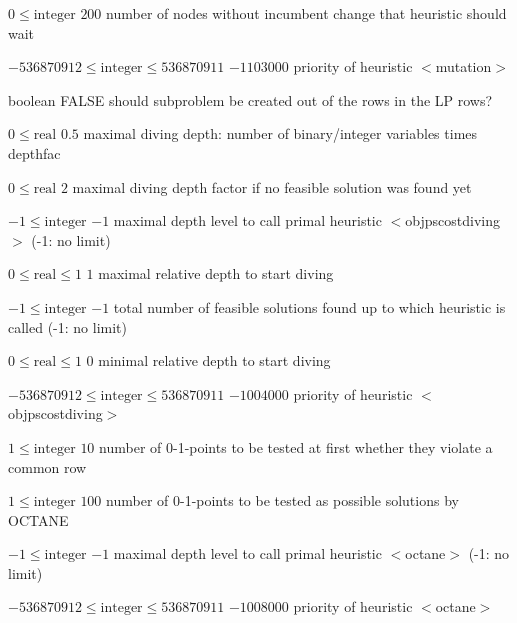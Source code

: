 %
{$0\leq\textrm{integer}$}%
{$200$}%
{number of nodes without incumbent change that heuristic should wait}%
{}

%
{$-536870912\leq\textrm{integer}\leq536870911$}%
{$-1103000$}%
{priority of heuristic $<$mutation$>$}%
{}

%
{boolean}%
{FALSE}%
{should subproblem be created out of the rows in the LP rows?}%
{}

%
{$0\leq\textrm{real}$}%
{$0.5$}%
{maximal diving depth: number of binary/integer variables times depthfac}%
{}

%
{$0\leq\textrm{real}$}%
{$2$}%
{maximal diving depth factor if no feasible solution was found yet}%
{}

%
{$-1\leq\textrm{integer}$}%
{$-1$}%
{maximal depth level to call primal heuristic $<$objpscostdiving$>$ (-1: no limit)}%
{}

%
{$0\leq\textrm{real}\leq1$}%
{$1$}%
{maximal relative depth to start diving}%
{}

%
{$-1\leq\textrm{integer}$}%
{$-1$}%
{total number of feasible solutions found up to which heuristic is called (-1: no limit)}%
{}

%
{$0\leq\textrm{real}\leq1$}%
{$0$}%
{minimal relative depth to start diving}%
{}

%
{$-536870912\leq\textrm{integer}\leq536870911$}%
{$-1004000$}%
{priority of heuristic $<$objpscostdiving$>$}%
{}

%
{$1\leq\textrm{integer}$}%
{$10$}%
{number of 0-1-points to be tested at first whether they violate a common row}%
{}

%
{$1\leq\textrm{integer}$}%
{$100$}%
{number of 0-1-points to be tested as possible solutions by OCTANE}%
{}

%
{$-1\leq\textrm{integer}$}%
{$-1$}%
{maximal depth level to call primal heuristic $<$octane$>$ (-1: no limit)}%
{}

%
{$-536870912\leq\textrm{integer}\leq536870911$}%
{$-1008000$}%
{priority of heuristic $<$octane$>$}%
{}

